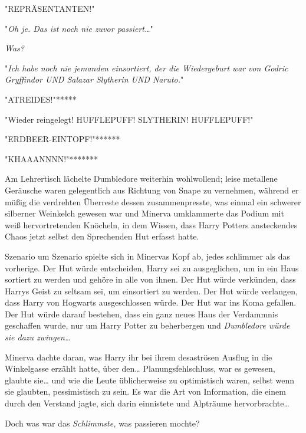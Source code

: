 {\later

"REPRÄSENTANTEN!"

\later

"\emph{Oh je. Das ist noch nie zuvor passiert…}"

\emph{Was?}

"\emph{Ich habe noch nie jemanden einsortiert, der die Wiedergeburt} \emph{war} \emph{von Godric Gryffindor UND Salazar Slytherin UND Naruto.}"

\later

"ATREIDES!"*****

\later

"Wieder reingelegt! HUFFLEPUFF! SLYTHERIN! HUFFLEPUFF!"

\later

"ERDBEER-EINTOPF!"******

\later

"KHAAANNNN!"*******

\later

Am Lehrertisch lächelte Dumbledore weiterhin wohlwollend; leise metallene Geräusche waren gelegentlich aus Richtung von Snape zu vernehmen, während er müßig die verdrehten Überreste dessen zusammenpresste, was einmal ein schwerer silberner Weinkelch gewesen war und Minerva umklammerte das Podium mit weiß hervortretenden Knöcheln, in dem Wissen, dass Harry Potters ansteckendes Chaos jetzt selbst den Sprechenden Hut erfasst hatte.

Szenario um Szenario spielte sich in Minervas Kopf ab, jedes schlimmer als das vorherige. Der Hut würde entscheiden, Harry sei zu ausgeglichen, um in ein Haus sortiert zu werden und gehöre in alle von ihnen. Der Hut würde verkünden, dass Harrys Geist zu seltsam sei, um einsortiert zu werden. Der Hut würde verlangen, dass Harry von Hogwarts ausgeschlossen würde. Der Hut war ins Koma gefallen. Der Hut würde darauf bestehen, dass ein ganz neues Haus der Verdammnis geschaffen wurde, nur um Harry Potter zu beherbergen und \emph{Dumbledore würde sie dazu zwingen…}

Minerva dachte daran, was Harry ihr bei ihrem desaströsen Ausflug in die Winkelgasse erzählt hatte, über den… Planungsfehlschluss, war es gewesen, glaubte sie… und wie die Leute üblicherweise zu optimistisch waren, selbst wenn sie glaubten, pessimistisch zu sein. Es war die Art von Information, die einem durch den Verstand jagte, sich darin einnistete und Alpträume hervorbrachte…

Doch was war das \emph{Schlimmste,} was passieren mochte?

}
